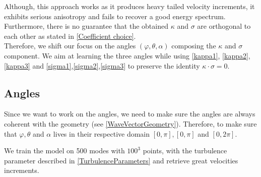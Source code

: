 \documentclass[a4paper,12pt]{article}
\theoremstyle{definition}
\begin{document}
Although, this approach works as it produces heavy tailed velocity increments, it exhibits serious anisotropy and fails to recover a good energy spectrum.\\
Furthermore, there is no guarantee that the obtained $\kappa$ and $\sigma$ are orthogonal to each other as stated in \ref{Coefficient choice}. \\
Therefore, we shift our focus on the angles $(\varphi,\theta,\alpha)$ composing the $\kappa$ and $\sigma$ component. We aim at learning the three angles while using \ref{kappa1}, \ref{kappa2},\ref{kappa3} and \ref{sigma1},\ref{sigma2},\ref{sigma3} to preserve the identity $\kappa\cdot\sigma=0$.


\subsection{Angles}
Since we want to work on the angles, we need to make sure the angles are always coherent with the geometry (see \ref{WaveVectorGeometry}). Therefore, to make sure that $\varphi, \theta$ and $\alpha$ lives in their respective domain $[0,\pi], [0,\pi]$ and $[0,2\pi]$.

We train the model on 500 modes with $100^3$ points, with the turbulence parameter described in \ref{TurbulenceParameters} and retrieve great velocities increments.
\end{document}
